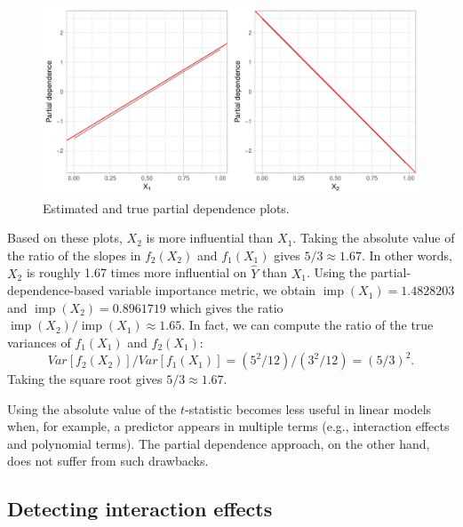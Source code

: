 \documentclass[12pt]{article}
\DeclareMathOperator{\imp}{imp}
\begin{document}
\begin{figure}[!htb]
  \centering
  \includegraphics[width=1.0\textwidth]{lm-pdps}
  \caption{Estimated and true partial dependence plots. \label{fig:lm-pdps}}
\end{figure}

Based on these plots, $X_2$ is more influential than $X_1$. Taking the absolute value of the ratio of the slopes in $f_2\left(X_2\right)$ and $f_1\left(X_1\right)$ gives $5 / 3 \approx 1.67$. In other words, $X_2$ is roughly 1.67 times more influential on $\widehat{Y}$ than $X_1$. Using the partial-dependence-based variable importance metric, we obtain $\imp\left(X_1\right) = 1.4828203$ and $\imp\left(X_2\right) = 0.8961719$ which gives the ratio $\imp\left(X_2\right) / \imp\left(X_1\right) \approx 1.65$. In fact, we can compute the ratio of the true variances of $f_1\left(X_1\right)$ and $f_2\left(X_1\right)$:
\begin{equation*}
Var\left[f_2\left(X_2\right)\right] / Var\left[f_1\left(X_1\right)\right] = \left(5^2 / 12\right) / \left(3^2 / 12\right) = \left(5 / 3\right)^2.
\end{equation*}
Taking the square root gives $5 / 3 \approx 1.67$.

Using the absolute value of the $t$-statistic becomes less useful in linear models when, for example, a predictor appears in multiple terms (e.g., interaction effects and polynomial terms). The partial dependence approach, on the other hand, does not suffer from such drawbacks.


\subsection{Detecting interaction effects}
\label{sec:interaction}
\end{document}
